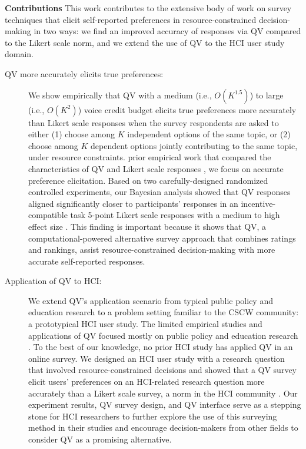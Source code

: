 \textbf{Contributions} This work contributes to the extensive body of work on survey techniques that elicit self-reported preferences in resource-constrained decision-making in two ways: we find an improved accuracy of responses via QV compared to the Likert scale norm, and we extend the use of QV to the HCI user study domain.

\begin{description}
\item[QV more accurately elicits true preferences:] We show empirically that QV with a medium (i.e., $O(K^{1.5})$) to large (i.e., $O(K^{2})$) voice credit budget elicits true preferences more accurately than Likert scale responses when the survey respondents are asked to either (1) choose among $K$ independent options of the same topic, or (2) choose among $K$ dependent options jointly contributing to the same topic, under resource constraints.  prior empirical work that compared the characteristics of QV and Likert scale responses \cite{quarfoot2017quadratic, naylor2017first}, we focus on accurate preference elicitation. Based on two carefully-designed randomized controlled experiments, our Bayesian analysis showed that QV responses aligned significantly closer to participants' responses in an incentive-compatible task  5-point Likert scale responses with a medium to high effect size . This finding is important because it shows that QV, a computational-powered alternative survey approach that combines ratings and rankings,  assist resource-constrained decision-making with more accurate self-reported responses.
\item[Application of QV to HCI:] We extend QV's application scenario from typical public policy and education research to a problem setting familiar to the CSCW community: a prototypical HCI user study. The limited empirical studies and applications of QV focused mostly on public policy \cite{quarfoot2017quadratic, colorado_qv} and education research \cite{naylor2017first}. To the best of our knowledge, no prior HCI study has applied QV in an online survey. We designed an HCI user study with a research question that involved resource-constrained decisions and showed that a QV survey  elicit users' preferences on an HCI-related research question more accurately than a Likert scale survey, a norm in the HCI community \cite{ledo2018evaluation}. Our experiment results, QV survey design, and QV interface serve as a stepping stone for HCI researchers to further explore the use of this surveying method in their studies and encourage decision-makers from other fields to consider QV as a promising alternative.
\end{description}

